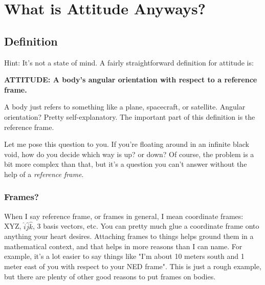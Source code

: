 \documentclass[a4paper,14pt]{extreport}
\begin{document}
\chapter{What is Attitude Anyways?}

\section{Definition}
Hint: It's not a state of mind. A fairly straightforward definition for attitude is:

\begin{center}
\textbf{ATTITUDE: A body's angular orientation with respect to a reference frame.}
\end{center}

A body just refers to something like a plane, spacecraft, or satellite. Angular orientation? Pretty self-explanatory. The important part of this definition is the reference frame. 

Let me pose this question to you. If you're floating around in an infinite black void, how do you decide which way is up? or down? Of course, the problem is a bit more complex than that, but it's a question you can't answer without the help of a \textit{reference frame}.

\subsection{Frames?}

When I say reference frame, or frames in general, I mean coordinate frames: XYZ, \(\hat{i}\hat{j}\hat{k}\), 3 basis vectors, etc. You can pretty much glue a coordinate frame onto anything your heart desires. Attaching frames to things helps ground them in a mathematical context, and that helps in more reasons than I can name. For example, it's a lot easier to say things like "I'm about 10 meters south and 1 meter east of you with respect to your NED frame". This is just a rough example, but there are plenty of other good reasons to put frames on bodies.
\end{document}
